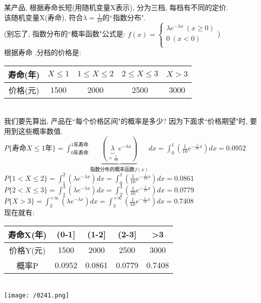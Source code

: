 \documentclass[UTF8]{ctexart}
\begin{document}
\begin{myEnvSample}
	某产品, 根据寿命长短(用随机变量X表示), 分为三档, 每档有不同的定价. \\
	该随机变量X(寿命), 符合$\lambda =\frac{1}{10}$的``指数分布". \\
	(别忘了, 指数分布的``概率函数"公式是: $	f(x)=\left\{ \begin{array}{l}
		\lambda e^{-\lambda x}\ (x\ge 0)\\
		0\ (x<0)\\
	\end{array} \right. 	$) \\

根据寿命 ,分档的价格是:  \\
\begin{tabular}{|c|c|c|c|c|}
	\hline
	寿命(年) & $X \leq 1$ & $1 \leq X \leq 2$ & $2 \leq X \leq 3$ & $X>3$ \\
	\hline
	价格(元) & 1500 & 2000 & 2500 & 3000 \\
	\hline
\end{tabular} \\

我们要先算出, 产品在``每个价格区间"的概率是多少?  因为下面求``价格期望"时, 要用到这些概率数值. \\
$P\{\text{寿命}X\leq 1\text{年\}}=\int_{0\text{年寿命}}^{1\text{年寿命}}{\underset{\text{指数分布的概率函数}f(x)}{\underbrace{\left( \underset{=\frac{1}{10}}{\underbrace{\lambda }}e^{-\lambda x} \right) }}}dx=\int_0^1{\left( \frac{1}{10}e^{-\frac{1}{10}x} \right) dx=0.0952}
$ \\
$P\{1<X\leq 2\}=\int_1^2{\left( \lambda e^{-\lambda x} \right)}dx=\int_0^1{\left( \frac{1}{10}e^{-\frac{1}{10}x} \right) dx=0.0861}
$ \\
$P\{2<X\leq 3\}=\int_2^3{\left( \lambda e^{-\lambda x} \right)}dx=\int_2^3{\left( \frac{1}{10}e^{-\frac{1}{10}x} \right) dx=0.0779}
$ \\
$P\{X>3\}=\int_3^{+\infty}{\left( \lambda e^{-\lambda x} \right)}dx=\int_3^{+\infty}{\left( \frac{1}{10}e^{-\frac{1}{10}x} \right) dx=0.7408}
$ \\

现在就有: \\
\begin{tabular}{|c|c|c|c|c|}
	\hline
	寿命X(年) & (0-1] & (1-2] & (2-3] & >3 \\
	\hline
	价格Y(元) & 1500 & 2000 & 2500 & 3000 \\
	\hline
	概率P & 0.0952 & 0.0861 & 0.0779 & 0.7408 \\
	\hline
\end{tabular} \\
\texttt{[image: /0241.png]} \\


\end{myEnvSample}
\end{document}
